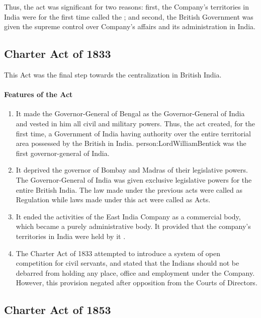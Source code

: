 Thus, the act was significant for two reasons: first, the Company's territories in India were for the first time called the ; and second, the British Government was given the supreme control over Company's affairs and its administration in India.

\subsection{Charter Act of 1833}

This Act was the final step towards the centralization in British India.

\paragraph{Features of the Act}
\begin{enumerate}
  \item It made the Governor-General of Bengal as the Governor-General of India and vested in him all civil and military powers. Thus, the act created, for the first time, a Government of India having authority over the entire territorial area possessed by the British in India. \gls{person:LordWilliamBentick} was the first governor-general of India.
  \item It deprived the governor of Bombay and Madras of their legislative powers. The Governor-General of India was given exclusive legislative powers for the entire British India. The law made under the previous acts were called as Regulation while laws made under this act were called as Acts.
  \item It ended the activities of the East India Company as a commercial body, which became a purely administrative body. It provided that the company's territories in India were held by it .
  \item The Charter Act of 1833 attempted to introduce a system of open competition for civil servants, and stated that the Indians should not be debarred from holding any place, office and employment under the Company. However, this provision negated after opposition from the Courts of Directors.
\end{enumerate}

\subsection{Charter Act of 1853}

